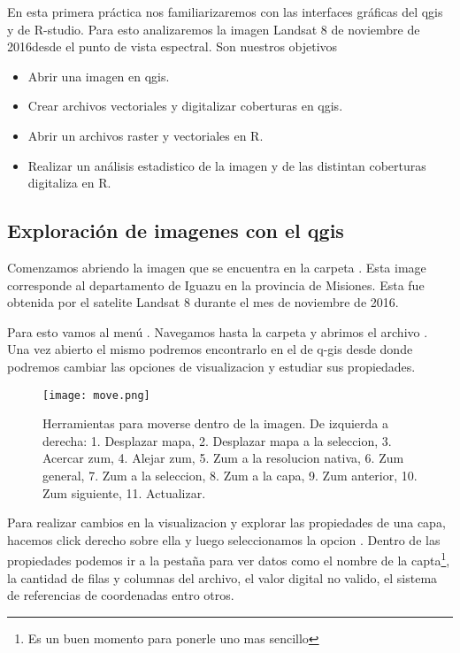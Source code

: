 En esta primera práctica nos familiarizaremos con las interfaces gráficas del
qgis y de R-studio. Para esto analizaremos la imagen Landsat 8 de noviembre de
2016desde el punto de vista espectral. Son nuestros objetivos

\begin{itemize}
    \item Abrir una imagen en qgis.
    \item Crear archivos vectoriales y digitalizar coberturas en qgis.
    \item Abrir un archivos raster y vectoriales en R.
    \item Realizar un análisis estadistico de la imagen y de las
        distintan coberturas digitaliza en R.
\end{itemize}
\subsection{Exploración de imagenes con el qgis}

Comenzamos abriendo la imagen  que se encuentra
en la carpeta . Esta image  corresponde al
departamento de Iguazu en la provincia de Misiones. Esta fue obtenida por
el satelite Landsat 8 durante el mes de noviembre de 2016.

Para esto vamos al menú . Navegamos
hasta la carpeta  y abrimos el archivo
. Una vez abierto el mismo podremos encontrarlo
en el  de q-gis desde donde podremos cambiar las opciones
de visualizacion y estudiar sus propiedades.

\begin{figure}[h!]
\begin{center}
    \texttt{[image: move.png]}
\end{center}
\caption{Herramientas para moverse dentro de la imagen. De izquierda a derecha:
    1. Desplazar mapa, 2. Desplazar mapa a la seleccion, 3. Acercar zum, 4.
    Alejar zum, 5. Zum a la resolucion nativa, 6. Zum general, 7. Zum a la
    seleccion, 8. Zum a la capa, 9. Zum anterior, 10. Zum siguiente, 11.
    Actualizar.}
\label{fig:move}
\end{figure}

Para realizar cambios en la visualizacion y explorar las propiedades de una
capa, hacemos click derecho sobre ella y luego seleccionamos la opcion
. Dentro de las propiedades podemos ir a la pestaña
 para ver datos como el nombre de la capta\footnote{Es un buen
momento para ponerle uno mas sencillo}, la cantidad de filas y columnas del
archivo, el valor digital no valido, el sistema de referencias de coordenadas
entro otros.


